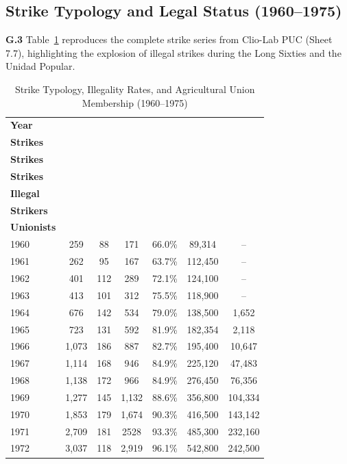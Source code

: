 \subsection{Strike Typology and Legal Status (1960--1975)}
\label{app:strike_typology}

\textbf{G.3} Table~\ref{tab:app_strikes_cliolab} reproduces the complete strike series from Clio-Lab PUC (Sheet 7.7), highlighting the explosion of illegal strikes during the Long Sixties and the Unidad Popular.

\begin{table}[htbp]
\centering
\footnotesize
\setlength{\tabcolsep}{4.5pt}
\caption{Strike Typology, Illegality Rates, and Agricultural Union Membership (1960--1975)}
\label{tab:app_strikes_cliolab}
\begin{tabular}{lcccccc}
\toprule
\textbf{Year} & \shortstack{\textbf{Total}\\\textbf{Strikes}} & \shortstack{\textbf{Legal}\\\textbf{Strikes}} & \shortstack{\textbf{Illegal}\\\textbf{Strikes}} & \shortstack{\textbf{\%}\\\textbf{Illegal}} & \shortstack{\textbf{Total}\\\textbf{Strikers}} & \shortstack{\textbf{Peasant}\\\textbf{Unionists}} \\
\midrule
1960 & 259 & 88 & 171 & 66.0\% & 89,314 & -- \\
1961 & 262 & 95 & 167 & 63.7\% & 112,450 & -- \\
1962 & 401 & 112 & 289 & 72.1\% & 124,100 & -- \\
1963 & 413 & 101 & 312 & 75.5\% & 118,900 & -- \\
1964 & 676 & 142 & 534 & 79.0\% & 138,500 & 1,652 \\
1965 & 723 & 131 & 592 & 81.9\% & 182,354 & 2,118 \\
1966 & 1,073 & 186 & 887 & 82.7\% & 195,400 & 10,647 \\
1967 & 1,114 & 168 & 946 & 84.9\% & 225,120 & 47,483 \\
1968 & 1,138 & 172 & 966 & 84.9\% & 276,450 & 76,356 \\
1969 & 1,277 & 145 & 1,132 & 88.6\% & 356,800 & 104,334 \\
1970 & 1,853 & 179 & 1,674 & 90.3\% & 416,500 & 143,142 \\
1971 & 2,709 & 181 & 2528 & 93.3\% & 485,300 & 232,160 \\
1972 & 3,037 & 118 & 2,919 & 96.1\% & 542,800 & 242,500 \\

\end{tabular}
\end{table}
